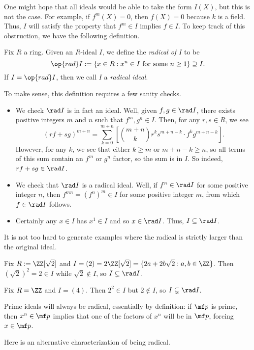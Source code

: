 \documentclass[../notes.tex]{subfiles}
\begin{document}
One might hope that all ideals would be able to take the form $I(X)$, but this is not the case. For example, if $f^m(X)=0$, then $f(X)=0$ because $k$ is a field. Thus, $I$ will satisfy the property that $f^m\in I$ implies $f\in I$. To keep track of this obstruction, we have the following definition.
\begin{definition}[Radical]
	Fix $R$ a ring. Given an $R$-ideal $I$, we define the \textit{radical of $I$} to be
	\[\op{rad}I:=\left\{x\in R:x^n\in I\text{ for some }n\ge1\right\}\supseteq I.\]
	If $I=\op{rad}I$, then we call $I$ a \textit{radical ideal}.
\end{definition}
To make sense, this definition requires a few sanity checks.
\begin{itemize}
	\item We check $\rad I$ is in fact an ideal. Well, given $f,g\in\rad I$, there exists positive integers $m$ and $n$ such that $f^m,g^n\in I$. Then, for any $r,s\in R$, we see
	\[(rf+sg)^{m+n}=\sum_{k=0}^{m+n}\left[\binom{m+n}kr^ks^{m+n-k}\cdot f^kg^{m+n-k}\right].\]
	However, for any $k$, we see that either $k\ge m$ or $m+n-k\ge n$, so all terms of this sum contain an $f^m$ or $g^n$ factor, so the sum is in $I$. So indeed, $rf+sg\in\rad I$.
	\item We check that $\rad I$ is a radical ideal. Well, if $f^n\in\rad I$ for some positive integer $n$, then $f^{mn}=\left(f^n\right)^m\in I$ for some positive integer $m$, from which $f\in\rad I$ follows.
	\item Certainly any $x\in I$ has $x^1\in I$ and so $x\in\rad I$. Thus, $I\subseteq\rad I$.
\end{itemize}
It is not too hard to generate examples where the radical is strictly larger than the original ideal.
\begin{example}
	Fix $R:=\ZZ[\sqrt2]$ and $I=(2)=2\ZZ[\sqrt2]=\{2a+2b\sqrt2:a,b\in\ZZ\}$. Then $\left(\sqrt2\right)^2=2\in I$ while $\sqrt2\notin I$, so $I\subsetneq\rad I$.
\end{example}
\begin{example}
	Fix $R=\ZZ$ and $I=(4)$. Then $2^2\in I$ but $2\notin I$, so $I\subsetneq\rad I$.
\end{example}
\begin{remark}
	Prime ideals will always be radical, essentially by definition: if $\mf p$ is prime, then $x^n\in\mf p$ implies that one of the factors of $x^n$ will be in $\mf p$, forcing $x\in\mf p$.
\end{remark}
Here is an alternative characterization of being radical.
\end{document}
